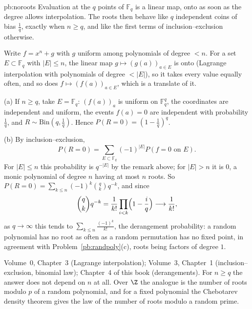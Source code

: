 \begin{solution}{pb:noroots}
\idea Evaluation at the $q$ points of $\mathbb F_q$ is a linear map, onto as soon as the degree allows interpolation. The roots then
behave like $q$ independent coins of bias $\frac1q$, exactly when $n\ge q$, and like the first terms of inclusion--exclusion
otherwise.

\writeup Write $f=x^n+g$ with $g$ uniform among polynomials of degree $<n$. For a set $E\subset\mathbb F_q$ with $|E|\le n$, the linear map
$g\mapsto(g(a))_{a\in E}$ is onto (Lagrange interpolation with polynomials of degree $<|E|$), so it takes every value equally often,
and so does $f\mapsto(f(a))_{a\in E}$, which is a translate of it.

(a) If $n\ge q$, take $E=\mathbb F_q$: $(f(a))_a$ is uniform on $\mathbb F_q^q$, the coordinates are independent and uniform, the events
$f(a)=0$ are independent with probability $\frac1q$, and $R\sim\mathrm{Bin}(q,\frac1q)$. Hence $P(R=0)=(1-\frac1q)^q$.

(b) By inclusion--exclusion,
\[
P(R=0)=\sum_{E\subset\mathbb F_q}(-1)^{|E|}P(f=0\text{ on }E).
\]
For $|E|\le n$ this probability is $q^{-|E|}$ by the
remark above; for $|E|>n$ it is $0$, a monic polynomial of degree $n$ having at most $n$ roots. So
$P(R=0)=\sum_{k\le n}(-1)^k\binom qkq^{-k}$, and since
\[
\binom qkq^{-k}=\frac1{k!}\prod_{i<k}\Bigl(1-\frac iq\Bigr)\longrightarrow\frac1{k!},
\]
as $q\to\infty$ this tends to $\sum_{k\le n}\frac{(-1)^k}{k!}$, the derangement probability: a random polynomial has no root as often as a random
permutation has no fixed point, in agreement with Problem~\ref{pb:randpoly}(c), roots being factors of degree $1$.

\tools Volume~0, Chapter~3 (Lagrange interpolation); Volume~3, Chapter~1 (inclusion--exclusion, binomial law); Chapter~4 of this book
(derangements).
\leads For $n\ge q$ the answer does not depend on $n$ at all. Over $\Z$ the analogue is the number of roots modulo $p$ of a random
polynomial, and for a fixed polynomial the Chebotarev density theorem gives the law of the number of roots modulo a random prime.
\end{solution}

